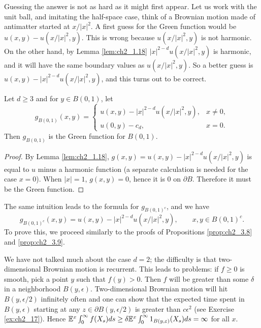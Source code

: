 Guessing the answer is not as hard as it might first appear. Let us work with the unit ball, and imitating the half-space case, think of a Brownian motion made of antimatter started at $x/|x|^2$. A first guess for the Green function would be $u(x,y) - u(x/|x|^2,y)$. This is wrong because $u(x/|x|^2,y)$ is not harmonic. On the other hand, by Lemma \ref{lem:ch2_1.18} $|x|^{2-d}u(x/|x|^2,y)$ is harmonic, and it will have the same boundary values as $u(x/|x|^2,y)$. So a better guess is $u(x,y) - |x|^{2-d}u(x/|x|^2,y)$, and this turns out to be correct.

\begin{proposition}\label{prop:ch2_3.9}
Let $d \geq 3$ and for $y \in B(0,1)$, let
\begin{equation}\label{eq:ch2_3.19}
    g_{B(0,1)}(x,y) = \begin{cases}
        u(x,y) - |x|^{2-d}u(x/|x|^2,y), & x \neq 0,\\
        u(0,y) - c_d, & x = 0.
    \end{cases}
\end{equation}
Then $g_{B(0,1)}$ is the Green function for $B(0,1)$.
\end{proposition}

\begin{proof}
By Lemma \ref{lem:ch2_1.18}, $g(x,y) = u(x,y) - |x|^{2-d}u(x/|x|^2,y)$ is equal to $u$ minus a harmonic function (a separate calculation is needed for the case $x = 0$). When $|x| = 1$, $g(x,y) = 0$, hence it is $0$ on $\partial B$. Therefore it must be the Green function.
\end{proof}

The same intuition leads to the formula for $g_{B(0,1)^c}$, and we have
\begin{equation}\label{eq:ch2_3.20}
    g_{B(0,1)^c}(x,y) = u(x,y) - |x|^{2-d}u(x/|x|^2,y), \qquad x,y \in B(0,1)^c.
\end{equation}
To prove this, we proceed similarly to the proofs of Propositions \ref{prop:ch2_3.8} and \ref{prop:ch2_3.9}.



We have not talked much about the case $d = 2$; the difficulty is that two-dimensional Brownian motion is recurrent. This leads to problems: if $f \geq 0$ is smooth, pick a point $y$ such that $f(y) > 0$. Then $f$ will be greater than some $\delta$ in a neighborhood $B(y,\epsilon)$. Two-dimensional Brownian motion will hit $B(y,\epsilon/2)$ infinitely often and one can show that the expected time spent in $B(y,\epsilon)$ starting at any $z \in \partial B(y,\epsilon/2)$ is greater than $c\epsilon^2$ (see Exercise \ref{ex:ch2_17}). Hence $\mathbb{E}^x\int_0^\infty f(X_s)ds \geq \delta\mathbb{E}^x\int_0^\infty 1_{B(y,\varepsilon)}(X_s)ds = \infty$ for all $x$.

